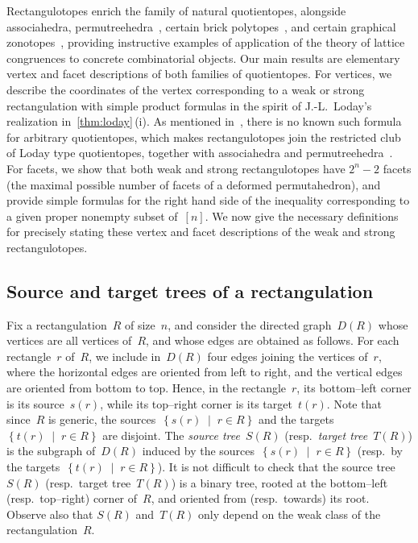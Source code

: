 \documentclass{amsart}
\theoremstyle{definition}
\newcommand{\set}[2]{\left\{ #1 \;\middle|\; #2 \right\}} %
\newcommand{\darkblue}{\color{darkblue}} %
\newcommand{\defn}[1]{\textsl{\darkblue #1}} %
\begin{document}
Rectangulotopes enrich the family of natural quotientopes, alongside associahedra, permutreehedra~\cite{MR3856522}, certain brick polytopes~\cite{PilaudSantos-brickPolytopes, PilaudStump-brickPolytopes, Pilaud-brickAlgebra}, and certain graphical zonotopes~\cite{Pilaud-brickAlgebra, Pilaud-acyclicReorientationLattices}, providing instructive examples of application of the theory of lattice congruences to concrete combinatorial objects.
Our main results are elementary vertex and facet descriptions of both families of quotientopes.
For vertices, we describe the coordinates of the vertex corresponding to a weak or strong rectangulation with simple product formulas in the spirit of J.-L.~Loday's realization in~\cref{thm:loday}\,(i).
As mentioned in~\cite{PilaudSantosZiegler}, there is no known such formula for arbitrary quotientopes, which makes rectangulotopes join the restricted club of Loday type quotientopes, together with associahedra and permutreehedra~\cite{MR3856522}.
For facets, we show that both weak and strong rectangulotopes have $2^n-2$ facets (the maximal possible number of facets of a deformed permutahedron), and provide simple formulas for the right hand side of the inequality corresponding to a given proper nonempty subset of~$[n]$.
We now give the necessary definitions for precisely stating these vertex and facet descriptions of the weak and strong rectangulotopes.


\subsection{Source and target trees of a rectangulation}
\label{subsec:sourceTargetTrees}

Fix a rectangulation~$R$ of size~$n$, and consider the directed graph~$D(R)$ whose vertices are all vertices of~$R$, and whose edges are obtained as follows.
For each rectangle~$r$ of~$R$, we include in~$D(R)$ four edges joining the vertices of~$r$, where the horizontal edges are oriented from left to right, and the vertical edges are oriented from bottom to top.
Hence, in the rectangle~$r$, its bottom--left corner is its source~$s(r)$, while its top--right corner is its target~$t(r)$.
Note that since~$R$ is generic, the sources~$\set{s(r)}{r \in R}$ and the targets~$\set{t(r)}{r \in R}$ are disjoint.
The \defn{source tree}~$S(R)$ (resp.~\defn{target tree}~$T(R)$) is the subgraph of~$D(R)$ induced by the sources~$\set{s(r)}{r \in R}$ (resp.~by the targets~$\set{t(r)}{r \in R}$).
It is not difficult to check that the source tree~$S(R)$ (resp.~target tree~$T(R)$) is a binary tree, rooted at the bottom--left (resp.~top--right) corner of~$R$, and oriented from (resp.~towards) its root.
Observe also that $S(R)$ and~$T(R)$ only depend on the weak class of the rectangulation~$R$.
\end{document}
